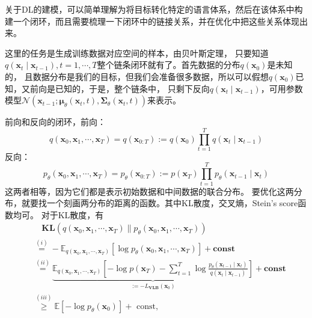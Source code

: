\documentclass[lang=cn,newtx,10pt,scheme=chinese]{elegantbook}
\begin{document}
关于DL的建模，可以简单理解为将目标转化特定的语言体系，然后在该体系中构建一个闭环，而且需要梳理一下闭环中的链接关系，并在优化中把这些关系体现出来。

这里的任务是生成训练数据对应空间的样本，由贝叶斯定理，
只要知道$q(\mathbf{x}_t \mid \mathbf{x}_{t-1}), t=1,\cdots, T$整个链条闭环就有了。首先数据的分布$q(\mathbf{x}_0)$是未知的，
且数据分布是我们的目标，但我们会准备很多数据，所以可以假想$q(\mathbf{x}_0)$已知，又前向是已知的，于是，整个链条中，
只剩下反向$q(\mathbf{x}_t \mid \mathbf{x}_{t-1})$，可用参数模型$\mathcal{N}\left(\mathbf{x}_{t-1} ;
 \boldsymbol{\mu}_\theta\left(\mathbf{x}_t, t\right), \boldsymbol{\Sigma}_\theta\left(\mathbf{x}_t, t\right)\right)$来表示。

前向和反向的闭环，前向：
\begin{equation}
q\left(\mathbf{x}_0, \mathbf{x}_1, \cdots, \mathbf{x}_T\right)=q(\mathbf{x}_{0:T}):=q\left(\mathbf{x}_0\right) \prod_{t=1}^T q\left(\mathbf{x}_t \mid \mathbf{x}_{t-1}\right)
\end{equation}
反向：
\begin{equation}
p_\theta\left(\mathbf{x}_0, \mathbf{x}_1, \cdots, \mathbf{x}_T\right)=p_\theta(\mathbf{x}_{0:T}):=p\left(\mathbf{x}_T\right) \prod_{t=1}^T p_\theta\left(\mathbf{x}_{t-1} \mid \mathbf{x}_t\right)
\end{equation}
这两者相等，因为它们都是表示初始数据和中间数据的联合分布。
要优化这两分布，就要找一个刻画两分布的距离的函数。其中KL散度，交叉熵，Stein's score函数均可。
对于KL散度，有
\begin{equation}
\begin{aligned}
& \quad \mathbf{KL}\left(q\left(\mathbf{x}_0, \mathbf{x}_1, \cdots, \mathbf{x}_T\right) \| p_\theta\left(\mathbf{x}_0, \mathbf{x}_1, \cdots, \mathbf{x}_T\right)\right) \\
& \stackrel{(i)}{=}-\mathbb{E}_{q\left(\mathbf{x}_0, \mathbf{x}_1, \cdots, \mathbf{x}_T\right)}\left[\log p_\theta\left(\mathbf{x}_0, \mathbf{x}_1, \cdots, \mathbf{x}_T\right)\right]+\mathbf{const} \\
& \stackrel{(i i)}{=} \underbrace{\mathbb{E}_{q\left(\mathbf{x}_0, \mathbf{x}_1, \cdots, \mathbf{x}_T\right)}\left[-\log p\left(\mathbf{x}_T\right)-\sum_{t=1}^T \log \frac{p_\theta\left(\mathbf{x}_{t-1} \mid \mathbf{x}_t\right)}{q\left(\mathbf{x}_t \mid \mathbf{x}_{t-1}\right)}\right]}_{:=-L_{\mathbf{VLB}}\left(\mathbf{x}_0\right)}+\mathbf{const} \\
& \stackrel{(i i i)}{\geq} \mathbb{E}\left[-\log p_\theta\left(\mathbf{x}_0\right)\right]+\text { const, }
\end{aligned}
\end{equation}
\end{document}
